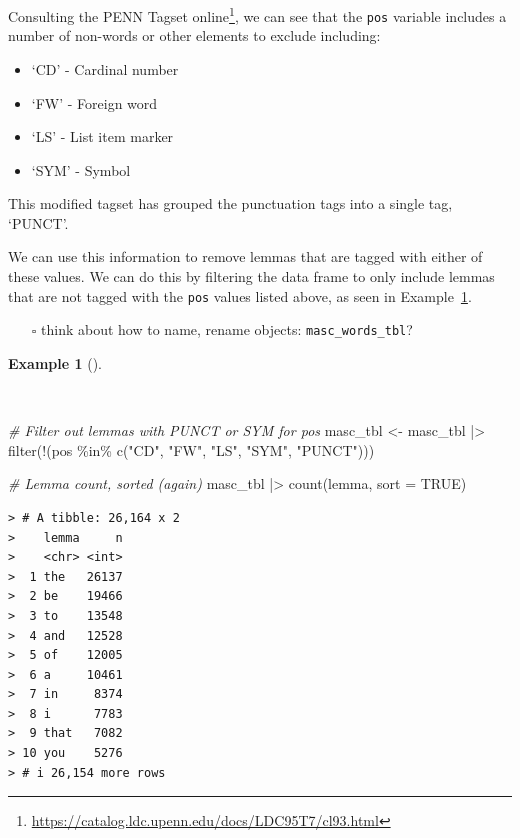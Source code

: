 \documentclass[
  letterpaper,
  DIV=11,
  numbers=noendperiod]{scrreport}
\newenvironment{Shaded}{\begin{snugshade}}{\end{snugshade}}
\newcommand{\AttributeTok}[1]{\textcolor[rgb]{0.00,0.00,0.00}{#1}}
\newcommand{\CommentTok}[1]{\textcolor[rgb]{0.00,0.00,0.00}{\textit{#1}}}
\newcommand{\ConstantTok}[1]{\textcolor[rgb]{0.00,0.00,0.00}{#1}}
\newcommand{\FunctionTok}[1]{\textcolor[rgb]{0.00,0.00,0.00}{#1}}
\newcommand{\NormalTok}[1]{\textcolor[rgb]{0.00,0.00,0.00}{#1}}
\newcommand{\OtherTok}[1]{\textcolor[rgb]{0.00,0.00,0.00}{#1}}
\newcommand{\SpecialCharTok}[1]{\textcolor[rgb]{0.00,0.00,0.00}{#1}}
\newcommand{\StringTok}[1]{\textcolor[rgb]{0.00,0.00,0.00}{#1}}
\providecommand{\tightlist}{%
  \setlength{\itemsep}{0pt}\setlength{\parskip}{0pt}}\usepackage{longtable,booktabs,array}
\theoremstyle{definition}
\newtheorem{example}{Example}[chapter]
\theoremstyle{remark}
\DeclareRobustCommand{\href}[2]{#2\footnote{\url{#1}}}
\begin{document}
Consulting the
\href{https://catalog.ldc.upenn.edu/docs/LDC95T7/cl93.html}{PENN Tagset
online}, we can see that the \texttt{pos} variable includes a number of
non-words or other elements to exclude including:

\begin{itemize}
\tightlist
\item
  `CD' - Cardinal number
\item
  `FW' - Foreign word
\item
  `LS' - List item marker
\item
  `SYM' - Symbol
\end{itemize}

This modified tagset has grouped the punctuation tags into a single tag,
`PUNCT'.

We can use this information to remove lemmas that are tagged with either
of these values. We can do this by filtering the data frame to only
include lemmas that are not tagged with the \texttt{pos} values listed
above, as seen in Example~\ref{exm-eda-masc-count-filter}.

\begin{itemize}
\tightlist
\item[$\square$]
  think about how to name, rename objects: \texttt{masc\_words\_tbl}?
\end{itemize}

\begin{example}[]\protect\hypertarget{exm-eda-masc-count-filter}{}\label{exm-eda-masc-count-filter}

~

\begin{Shaded}
\begin{Highlighting}[]
\CommentTok{\# Filter out lemmas with PUNCT or SYM for pos}
\NormalTok{masc\_tbl }\OtherTok{\textless{}{-}} 
\NormalTok{  masc\_tbl }\SpecialCharTok{|\textgreater{}} 
  \FunctionTok{filter}\NormalTok{(}\SpecialCharTok{!}\NormalTok{(pos }\SpecialCharTok{\%in\%} \FunctionTok{c}\NormalTok{(}\StringTok{"CD"}\NormalTok{, }\StringTok{"FW"}\NormalTok{, }\StringTok{"LS"}\NormalTok{, }\StringTok{"SYM"}\NormalTok{, }\StringTok{"PUNCT"}\NormalTok{)))}

\CommentTok{\# Lemma count, sorted (again)}
\NormalTok{masc\_tbl }\SpecialCharTok{|\textgreater{}} 
  \FunctionTok{count}\NormalTok{(lemma, }\AttributeTok{sort =} \ConstantTok{TRUE}\NormalTok{)}
\end{Highlighting}
\end{Shaded}

\begin{verbatim}
> # A tibble: 26,164 x 2
>    lemma     n
>    <chr> <int>
>  1 the   26137
>  2 be    19466
>  3 to    13548
>  4 and   12528
>  5 of    12005
>  6 a     10461
>  7 in     8374
>  8 i      7783
>  9 that   7082
> 10 you    5276
> # i 26,154 more rows
\end{verbatim}

\end{example}
\end{document}
